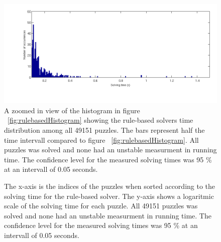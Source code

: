 \documentclass[a4paper,11pt]{kth-mag}
\begin{document}
\begin{figure}[here] 
\centering
\includegraphics[width=16cm]{images/rulebased_histogram2.png}
\caption{A zoomed in view of the histogram in figure ~\ref{fig:rulebasedHistogram} showing the rule-based solvers time distribution among all 49151 puzzles. The bars represent half the time intervall compared to figure ~\ref{fig:rulebasedHistogram}. All puzzles was solved and none had an unstable measurment in running time. The confidence level for the measured solving times was 95 \% at an intervall of 0.05 seconds.}
\label{fig:rulebasedHistogram2}
\end{figure}

\begin{figure}[here] 
\noindent{}
\caption{The x-axis is the indices of the puzzles when sorted according to the solving time for the rule-based solver. The y-axis shows a logaritmic scale of the solving time for each puzzle. All 49151 puzzles was solved and none had an unstable measurment in running time. The confidence level for the measured solving times was 95 \% at an intervall of 0.05 seconds.}
\label{fig:rulebasedIndices}
\end{figure}
\end{document}
